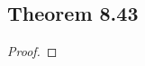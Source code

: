 \documentclass[../../main.tex]{subfiles}
\begin{document}
\subsection{Theorem 8.43}
\begin{wts}

\end{wts}
\begin{proof}

\end{proof}
\end{document}
